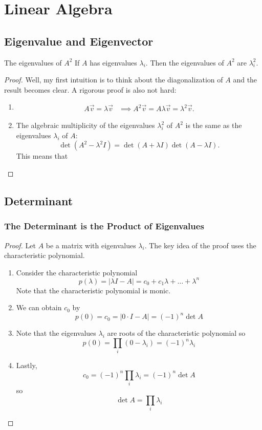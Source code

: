 \documentclass[../main]{subfiles}
\begin{document}
\chapter{Linear Algebra}
\section{Eigenvalue and Eigenvector}
\begin{bbox}{The eigenvalues of $A^2$}
    If $A$ has eigenvalues $\lambda_i$. Then the eigenvalues of $A^2$ are $\lambda_i^2$.
    \begin{proof}
        Well, my first intuition is to think about the diagonalization of $A$ and the result becomes clear.
        \newline
        A rigorous proof is also not hard: 
        \begin{enumerate}
            \item \begin{align*}
                A\vec v = \lambda \vec v &\implies A^2 \vec v = A \lambda\vec v = \lambda^2 \vec v.
            \end{align*}
        \item 
            The algebraic multiplicity of the eigenvalues $\lambda^2_i$ of $A^2$ is the same as the eigenvalues $\lambda_i$ of $A$:
            \[
            \det (A^2 - \lambda^2 I) = \det (A+\lambda I)\det (A-\lambda I).
            \]
            This means that
        \end{enumerate}
    \end{proof}
\end{bbox}
\section{Determinant}
\subsection{The Determinant is the Product of Eigenvalues}
\begin{proof}
    Let $A$ be a matrix with eigenvalues $\lambda_i$. The key idea of the proof uses the characteristic polynomial.
    \begin{enumerate}
        \item Consider the characteristic polynomial
        \[
        p(\lambda) = |\lambda I - A| = c_0 + c_1 \lambda + \dots + \lambda^n
        \]
        Note that the characteristic polynomial is monic.
        \item We can obtain $c_0$ by
        \[
        p(0) = c_0 = |0\cdot I - A| = (-1)^n \det A
        \]
        \item Note that the eigenvalues $\lambda_i$ are roots of the characteristic polynomial so 
        \[
        p(0) = \prod_i(0-\lambda_i) = (-1)^n \lambda_i
        \]
        \item Lastly, 
        \[
        c_0 = (-1)^n \prod_{i}\lambda_i  = (-1)^n \det A
        \]
        so 
        \[
        \det A = \prod_i \lambda_i
        \]
    \end{enumerate}
\end{proof}
\end{document}
